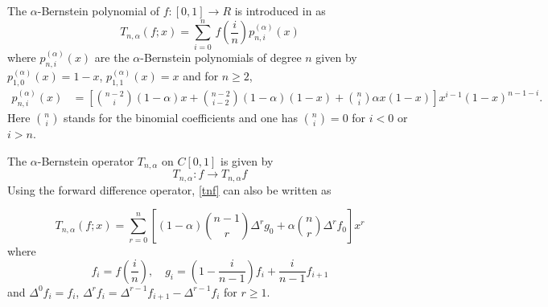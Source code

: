 \documentclass[12pt]{article}
\numberwithin{equation}{section} \theoremstyle{plain}
\theoremstyle{definition}
\theoremstyle{remark}
\begin{document}
The $\alpha$-Bernstein polynomial of $f:[0,1]\rightarrow R$ is introduced in \cite{xia} as
\begin{equation}\label{tnf}
T_{n,\alpha}(f;x)=\sum_{i=0}^n\,f\left(\frac{i}{n}\right)p_{n,i}^{(\alpha)}(x)
\end{equation}
where  $p_{n,i}^{(\alpha)}(x)$ are the $\alpha$-Bernstein polynomials of degree $n$ given by
$p_{1,0}^{(\alpha)}(x)=1-x$, $p_{1,1}^{(\alpha)}(x)=x$ and for $n\geq 2$,
\begin{align*}
p_{n,i}^{(\alpha)}(x)&=\left[\binom{n-2}{i}(1-\alpha)x+\binom{n-2}{i-2}(1-\alpha)(1-x)+\binom{n}{i}\alpha x(1-x)\right]x^{i-1}(1-x)^{n-1-i}.
\end{align*}
Here $\binom{n}{i}$ stands for the binomial coefficients and one has $\binom{n}{i}=0$ for $i<0$ or $i>n.$

The $\alpha$-Bernstein operator $T_{n,\alpha}$ on $C[0,1]$ is given by $$ T_{n,\alpha}:f \rightarrow T_{n,\alpha}f $$
Using the forward difference operator, \eqref{tnf} can also be written as 

\begin{equation*}
T_{n,\alpha}(f;x)=\sum_{r=0}^n\left[(1-\alpha)\binom{n-1}{r}\Delta^rg_0+\alpha\binom{n}{r}\Delta^rf_0\right]x^r
\end{equation*}
where 
$$
f_i=f\left(\frac{i}{n}\right), \quad g_i=\left(1-\frac{i}{n-1}\right)f_i+\frac{i}{n-1}f_{i+1}
$$
and $\Delta^{0}f_i=f_i$, $\Delta^{r}f_i=\Delta^{r-1}f_{i+1}-\Delta^{r-1}f_i$ for $r\geq 1.$
\end{document}

